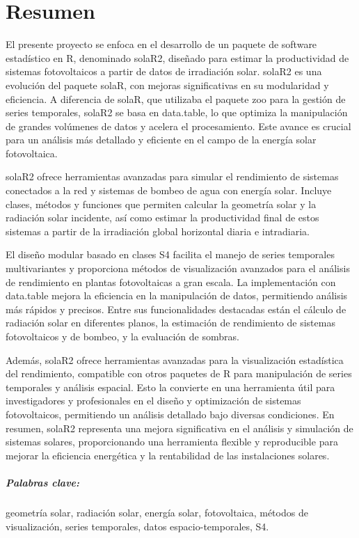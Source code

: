 \chapter*{Resumen}
El presente proyecto se enfoca en el desarrollo de un paquete de software estadístico en R, denominado solaR2, diseñado para estimar la productividad de sistemas fotovoltaicos a partir de datos de irradiación solar. solaR2 es una evolución del paquete solaR, con mejoras significativas en su modularidad y eficiencia. A diferencia de solaR, que utilizaba el paquete zoo para la gestión de series temporales, solaR2 se basa en data.table, lo que optimiza la manipulación de grandes volúmenes de datos y acelera el procesamiento. Este avance es crucial para un análisis más detallado y eficiente en el campo de la energía solar fotovoltaica.

solaR2 ofrece herramientas avanzadas para simular el rendimiento de sistemas conectados a la red y sistemas de bombeo de agua con energía solar. Incluye clases, métodos y funciones que permiten calcular la geometría solar y la radiación solar incidente, así como estimar la productividad final de estos sistemas a partir de la irradiación global horizontal diaria e intradiaria.

El diseño modular basado en clases S4 facilita el manejo de series temporales multivariantes y proporciona métodos de visualización avanzados para el análisis de rendimiento en plantas fotovoltaicas a gran escala. La implementación con data.table mejora la eficiencia en la manipulación de datos, permitiendo análisis más rápidos y precisos. Entre sus funcionalidades destacadas están el cálculo de radiación solar en diferentes planos, la estimación de rendimiento de sistemas fotovoltaicos y de bombeo, y la evaluación de sombras.

Además, solaR2 ofrece herramientas avanzadas para la visualización estadística del rendimiento, compatible con otros paquetes de R para manipulación de series temporales y análisis espacial. Esto la convierte en una herramienta útil para investigadores y profesionales en el diseño y optimización de sistemas fotovoltaicos, permitiendo un análisis detallado bajo diversas condiciones. En resumen, solaR2 representa una mejora significativa en el análisis y simulación de sistemas solares, proporcionando una herramienta flexible y reproducible para mejorar la eficiencia energética y la rentabilidad de las instalaciones solares.

\paragraph{Palabras clave:}
geometría solar, radiación solar, energía solar, fotovoltaica, métodos de visualización, series temporales, datos espacio-temporales, S4.

